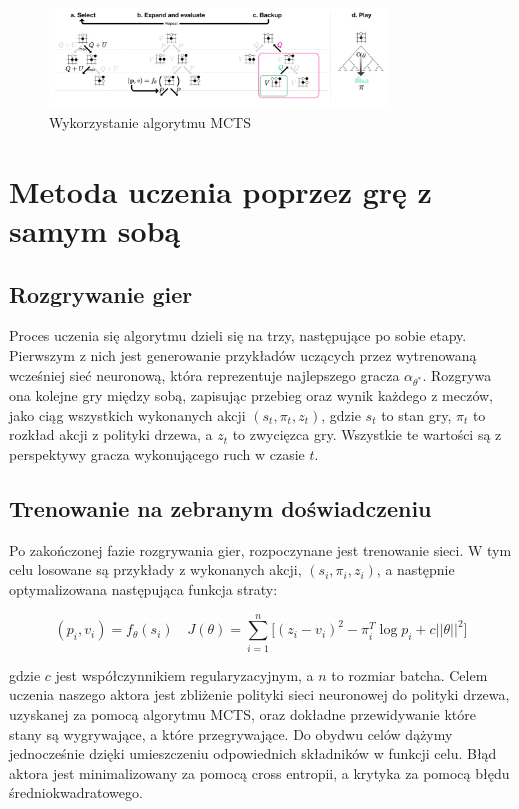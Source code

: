\documentclass[licencjacka]{pracamgr}
\begin{document}
\begin{figure}[ht!]
  \centering
  \includegraphics[width=0.8\textwidth]{alphago-mcts}
  \caption{Wykorzystanie algorytmu MCTS}
\end{figure}

\section{Metoda uczenia poprzez grę z samym sobą}

\subsection{Rozgrywanie gier}

Proces uczenia się algorytmu dzieli się na trzy, następujące po sobie etapy. Pierwszym z nich jest generowanie przykładów uczących przez wytrenowaną wcześniej sieć neuronową, która reprezentuje najlepszego gracza $\alpha_{\theta^\ast}$. Rozgrywa ona kolejne gry między sobą, zapisując przebieg oraz wynik każdego z meczów, jako ciąg wszystkich wykonanych akcji $(s_t, \pi_t, z_t)$, gdzie $s_t$ to stan gry, $\pi_t$ to rozkład akcji z polityki drzewa, a $z_t$ to zwycięzca gry. Wszystkie te wartości są z perspektywy gracza wykonującego ruch w czasie $t$.

\subsection{Trenowanie na zebranym doświadczeniu}

Po zakończonej fazie rozgrywania gier, rozpoczynane jest trenowanie sieci. W tym celu losowane są przykłady z wykonanych akcji, $(s_i, \pi_i, z_i)$, a następnie optymalizowana następująca funkcja straty:

$$ (p_i, v_i) = f_\theta(s_i) \quad
J(\theta) = \sum_{i = 1}^n \Big[ (z_i - v_i)^2 - \pi_i^T \log p_i + c \lvert \lvert \theta \rvert \rvert^2 \Big]
$$

gdzie $c$ jest współczynnikiem regularyzacyjnym, a $n$ to rozmiar batcha. Celem uczenia naszego aktora jest zbliżenie polityki sieci neuronowej do polityki drzewa, uzyskanej za pomocą algorytmu MCTS, oraz dokładne przewidywanie które stany są wygrywające, a które przegrywające. Do obydwu celów dążymy jednocześnie dzięki umieszczeniu odpowiednich składników w funkcji celu. Błąd aktora jest minimalizowany za pomocą cross entropii, a krytyka za pomocą błędu średniokwadratowego.
\end{document}
